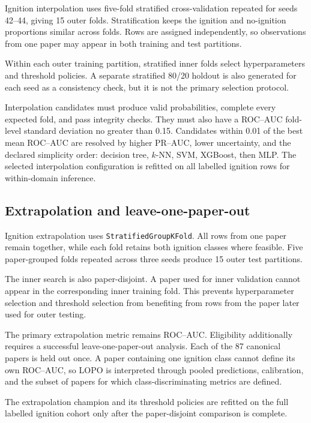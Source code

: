 Ignition interpolation uses five-fold stratified cross-validation repeated for
seeds 42--44, giving 15 outer folds. Stratification keeps the ignition and
no-ignition proportions similar across folds. Rows are assigned independently,
so observations from one paper may appear in both training and test partitions.

Within each outer training partition, stratified inner folds select
hyperparameters and threshold policies. A separate stratified 80/20 holdout is
also generated for each seed as a consistency check, but it is not the primary
selection protocol.

Interpolation candidates must produce valid probabilities, complete every
expected fold, and pass integrity checks. They must also have a ROC--AUC
fold-level standard deviation no greater than 0.15. Candidates within 0.01 of
the best mean ROC--AUC are resolved by higher PR--AUC, lower uncertainty, and
the declared simplicity order: decision tree, \(k\)-NN, SVM, XGBoost, then MLP.
The selected interpolation configuration is refitted on all labelled ignition
rows for within-domain inference.

\subsection{Extrapolation and leave-one-paper-out}

Ignition extrapolation uses \texttt{StratifiedGroupKFold}. All rows from one
paper remain together, while each fold retains both ignition classes where
feasible. Five paper-grouped folds repeated across three seeds produce 15 outer
test partitions.

The inner search is also paper-disjoint. A paper used for inner validation
cannot appear in the corresponding inner training fold. This prevents
hyperparameter selection and threshold selection from benefiting from rows from
the paper later used for outer testing.

The primary extrapolation metric remains ROC--AUC. Eligibility additionally
requires a successful leave-one-paper-out analysis. Each of the 87 canonical
papers is held out once. A paper containing one ignition class cannot define its
own ROC--AUC, so LOPO is interpreted through pooled predictions, calibration,
and the subset of papers for which class-discriminating metrics are defined.

The extrapolation champion and its threshold policies are refitted on the full
labelled ignition cohort only after the paper-disjoint comparison is complete.

